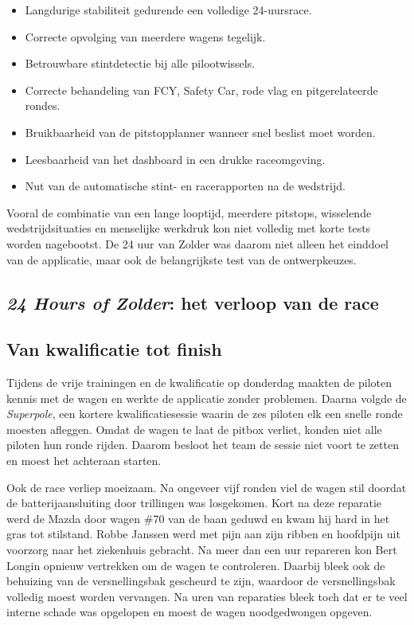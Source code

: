 \begin{itemize}
  \item Langdurige stabiliteit gedurende een volledige 24-uursrace.
  \item Correcte opvolging van meerdere wagens tegelijk.
  \item Betrouwbare stintdetectie bij alle pilootwissels.
  \item Correcte behandeling van FCY, Safety Car, rode vlag en pitgerelateerde rondes.
  \item Bruikbaarheid van de pitstopplanner wanneer snel beslist moet worden.
  \item Leesbaarheid van het dashboard in een drukke raceomgeving.
  \item Nut van de automatische stint- en racerapporten na de wedstrijd.
\end{itemize}

Vooral de combinatie van een lange looptijd, meerdere pitstops, wisselende wedstrijdsituaties en
menselijke werkdruk kon niet volledig met korte tests worden nagebootst. De 24 uur van Zolder was
daarom niet alleen het einddoel van de applicatie, maar ook de belangrijkste test van de
ontwerpkeuzes.


\subsection{\emph{24 Hours of Zolder}: het verloop van de race}

\subsection*{Van kwalificatie tot finish}
Tijdens de vrije trainingen en de kwalificatie op donderdag maakten de piloten kennis met de wagen en werkte de applicatie zonder problemen. Daarna volgde de \emph{Superpole}, een kortere kwalificatiesessie waarin de zes piloten elk een snelle ronde moesten afleggen. Omdat de wagen te laat de pitbox verliet, konden niet alle piloten hun ronde rijden. Daarom besloot het team de sessie niet voort te zetten en moest het achteraan starten.

Ook de race verliep moeizaam. Na ongeveer vijf ronden viel de wagen stil doordat de batterijaansluiting door trillingen was losgekomen. Kort na deze reparatie werd de Mazda door wagen \#70 van de baan geduwd en kwam hij hard in het gras tot stilstand. Robbe Janssen werd met pijn aan zijn ribben en hoofdpijn uit voorzorg naar het ziekenhuis gebracht.
Na meer dan een uur repareren kon Bert Longin opnieuw vertrekken om de wagen te controleren. Daarbij bleek ook de behuizing van de versnellingsbak gescheurd te zijn, waardoor de versnellingsbak volledig moest worden vervangen. Na uren van reparaties bleek toch dat er te veel interne schade was opgelopen en moest de wagen noodgedwongen opgeven.

